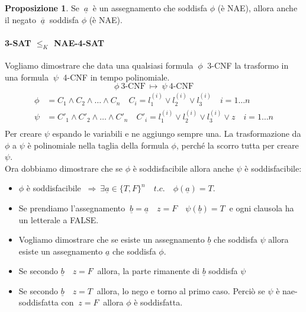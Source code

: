 \documentclass[a4paper]{article}
\theoremstyle{definition}
\newtheorem{prop}{Proposizione}[subsection]
\begin{document}
		\begin{prop}
			Se $ \ \underline{a} \ $ è un assegnamento che soddisfa $ \phi $ (è NAE), allora anche il negato $ \ \overline{\underline{a}} \ $ soddisfa  $ \phi $ (è NAE).
		\end{prop}
 		 
		\paragraph{3-SAT $ \leq_K $ NAE-4-SAT} Vogliamo dimostrare che data una qualsiasi formula $\ \phi \ $ 3-CNF la trasformo in una formula $\ \psi \ $ 4-CNF in tempo polinomiale.
		\[
	 		 \phi \ \text{3-CNF} \ \longmapsto \ \psi \ \text{4-CNF}
		\]
		\begin{align*}
			\phi &= C_1 \wedge C_2 \wedge \dots \wedge C_n \quad C_i = l^{(i)}_1 \vee l^{(i)}_2 \vee l^{(i)}_3 \quad i = 1 \dots n \\
			\psi &= C'_1 \wedge C'_2 \wedge \dots \wedge C'_n \quad C'_i = l^{(i)}_1 \vee l^{(i)}_2 \vee l^{(i)}_3 \vee z \quad i = 1 \dots n \\
		\end{align*}
		Per creare $ \psi $ espando le variabili e ne aggiungo sempre una. 
		La trasformazione da $ \phi $ a $ \psi $ è polinomiale nella taglia della formula $ \phi $, perché la scorro tutta per creare $ \psi $.\\
		Ora dobbiamo dimostrare che se $ \phi $ è soddisfacibile allora anche $ \psi $ è soddisfacibile:
		\begin{itemize}
			\item $ \phi $ è soddisfacibile $ \ \Rightarrow \ \exists \underline{a} \in \{T,F\}^n \quad t.c.\quad \phi(\underline{a}) = T $.
			\item Se prendiamo l'assegnamento $ \ \underline{b} = \underline{a} \quad z = F \quad \psi(\underline{b}) = T\ $ e ogni clausola ha un letterale a FALSE.
			\item Vogliamo dimostrare che se esiste un assegnamento $ \underline{b} $ che soddisfa $ \psi $ allora esiste un assegnamento $ \underline{a} $ che soddisfa $ \phi $.
			\item Se secondo $ \underline{b}\quad z = F\ $ allora, la parte rimanente di $ \underline{b} $ soddisfa $ \psi $
			\item Se secondo $ \underline{b}\quad z = T\ $ allora, lo nego e torno al primo caso. Perciò se $ \psi $ è nae-soddisfatta con $ \ z = F\ $ allora $ \phi $ è soddisfatta. 
		\end{itemize}
		
\end{document}
